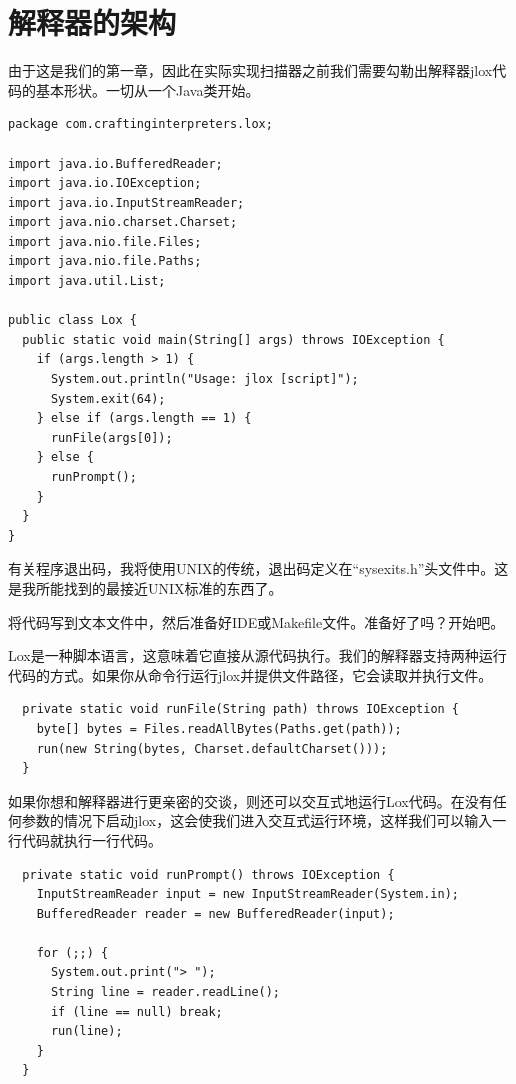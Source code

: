 \documentclass[cn,10pt,math=newtx,citestyle=gb7714-2015,bibstyle=gb7714-2015]{elegantbook}
\newenvironment{code}{\captionsetup{type=listing}}{}
\begin{document}
\section{解释器的架构}

由于这是我们的第一章，因此在实际实现扫描器之前我们需要勾勒出解释器jlox代码的基本形状。一切从一个Java类开始。

\begin{code}
\begin{verbatim}
package com.craftinginterpreters.lox;

import java.io.BufferedReader;
import java.io.IOException;
import java.io.InputStreamReader;
import java.nio.charset.Charset;
import java.nio.file.Files;
import java.nio.file.Paths;
import java.util.List;

public class Lox {
  public static void main(String[] args) throws IOException {
    if (args.length > 1) {
      System.out.println("Usage: jlox [script]");
      System.exit(64); 
    } else if (args.length == 1) {
      runFile(args[0]);
    } else {
      runPrompt();
    }
  }
}
\end{verbatim}
\end{code}

\begin{tcolorbox}
有关程序退出码，我将使用UNIX的传统，退出码定义在“sysexits.h”头文件中。这是我所能找到的最接近UNIX标准的东西了。
\end{tcolorbox}

将代码写到文本文件中，然后准备好IDE或Makefile文件。准备好了吗？开始吧。

Lox是一种脚本语言，这意味着它直接从源代码执行。我们的解释器支持两种运行代码的方式。如果你从命令行运行jlox并提供文件路径，它会读取并执行文件。

\begin{code}
\begin{verbatim}
  private static void runFile(String path) throws IOException {
    byte[] bytes = Files.readAllBytes(Paths.get(path));
    run(new String(bytes, Charset.defaultCharset()));
  }
\end{verbatim}
\end{code}

如果你想和解释器进行更亲密的交谈，则还可以交互式地运行Lox代码。在没有任何参数的情况下启动jlox，这会使我们进入交互式运行环境，这样我们可以输入一行代码就执行一行代码。

\begin{code}
\begin{verbatim}
  private static void runPrompt() throws IOException {
    InputStreamReader input = new InputStreamReader(System.in);
    BufferedReader reader = new BufferedReader(input);

    for (;;) { 
      System.out.print("> ");
      String line = reader.readLine();
      if (line == null) break;
      run(line);
    }
  }
\end{verbatim}
\end{code}
\end{document}
